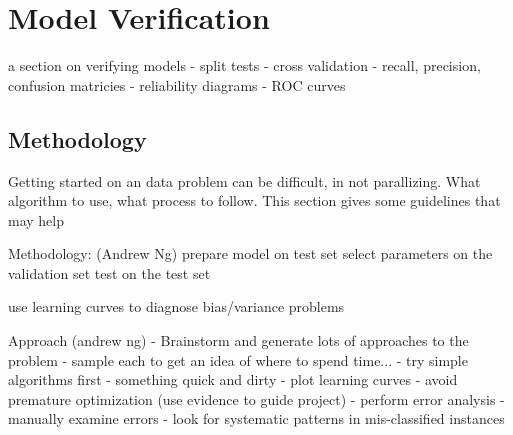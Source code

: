 

\section{Model Verification} 
\label{advanced:verification}

a section on verifying models
- split tests
- cross validation
- recall, precision, confusion matricies
- reliability diagrams
- ROC curves


\subsection{Methodology}
Getting started on an data problem can be difficult, in not parallizing. What algorithm to use, what process to follow. This section gives some guidelines that may help 


Methodology: (Andrew Ng)
prepare model on test set
select parameters on the validation set
test on the test set

use learning curves to diagnose bias/variance problems


Approach (andrew ng)
- Brainstorm and generate lots of approaches to the problem - sample each to get an idea of where to spend time...
- try simple algorithms first - something quick and dirty
- plot learning curves
	- avoid premature optimization (use evidence to guide project)
- perform error analysis
	- manually examine errors
	- look for systematic patterns in mis-classified instances